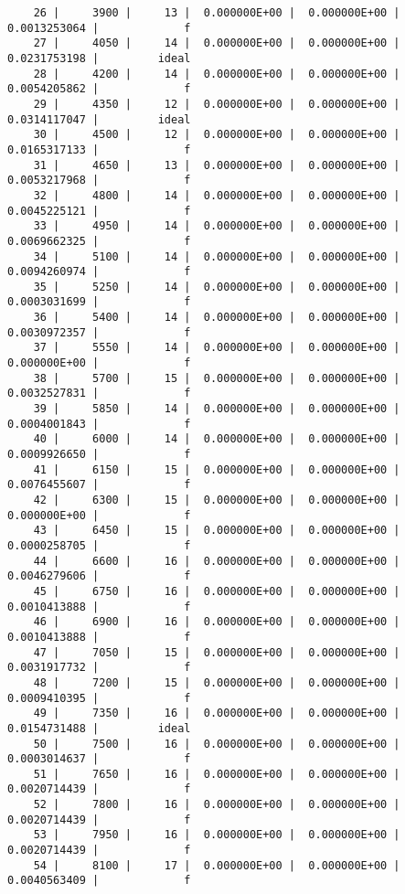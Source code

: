 \documentclass[
  authoryear,
  preprint,
  3p]{elsarticle}
\begin{document}
\begin{verbatim}
    26 |     3900 |     13 |  0.000000E+00 |  0.000000E+00 |  0.0013253064 |             f
    27 |     4050 |     14 |  0.000000E+00 |  0.000000E+00 |  0.0231753198 |         ideal
    28 |     4200 |     14 |  0.000000E+00 |  0.000000E+00 |  0.0054205862 |             f
    29 |     4350 |     12 |  0.000000E+00 |  0.000000E+00 |  0.0314117047 |         ideal
    30 |     4500 |     12 |  0.000000E+00 |  0.000000E+00 |  0.0165317133 |             f
    31 |     4650 |     13 |  0.000000E+00 |  0.000000E+00 |  0.0053217968 |             f
    32 |     4800 |     14 |  0.000000E+00 |  0.000000E+00 |  0.0045225121 |             f
    33 |     4950 |     14 |  0.000000E+00 |  0.000000E+00 |  0.0069662325 |             f
    34 |     5100 |     14 |  0.000000E+00 |  0.000000E+00 |  0.0094260974 |             f
    35 |     5250 |     14 |  0.000000E+00 |  0.000000E+00 |  0.0003031699 |             f
    36 |     5400 |     14 |  0.000000E+00 |  0.000000E+00 |  0.0030972357 |             f
    37 |     5550 |     14 |  0.000000E+00 |  0.000000E+00 |  0.000000E+00 |             f
    38 |     5700 |     15 |  0.000000E+00 |  0.000000E+00 |  0.0032527831 |             f
    39 |     5850 |     14 |  0.000000E+00 |  0.000000E+00 |  0.0004001843 |             f
    40 |     6000 |     14 |  0.000000E+00 |  0.000000E+00 |  0.0009926650 |             f
    41 |     6150 |     15 |  0.000000E+00 |  0.000000E+00 |  0.0076455607 |             f
    42 |     6300 |     15 |  0.000000E+00 |  0.000000E+00 |  0.000000E+00 |             f
    43 |     6450 |     15 |  0.000000E+00 |  0.000000E+00 |  0.0000258705 |             f
    44 |     6600 |     16 |  0.000000E+00 |  0.000000E+00 |  0.0046279606 |             f
    45 |     6750 |     16 |  0.000000E+00 |  0.000000E+00 |  0.0010413888 |             f
    46 |     6900 |     16 |  0.000000E+00 |  0.000000E+00 |  0.0010413888 |             f
    47 |     7050 |     15 |  0.000000E+00 |  0.000000E+00 |  0.0031917732 |             f
    48 |     7200 |     15 |  0.000000E+00 |  0.000000E+00 |  0.0009410395 |             f
    49 |     7350 |     16 |  0.000000E+00 |  0.000000E+00 |  0.0154731488 |         ideal
    50 |     7500 |     16 |  0.000000E+00 |  0.000000E+00 |  0.0003014637 |             f
    51 |     7650 |     16 |  0.000000E+00 |  0.000000E+00 |  0.0020714439 |             f
    52 |     7800 |     16 |  0.000000E+00 |  0.000000E+00 |  0.0020714439 |             f
    53 |     7950 |     16 |  0.000000E+00 |  0.000000E+00 |  0.0020714439 |             f
    54 |     8100 |     17 |  0.000000E+00 |  0.000000E+00 |  0.0040563409 |             f

\end{verbatim}
\end{document}
